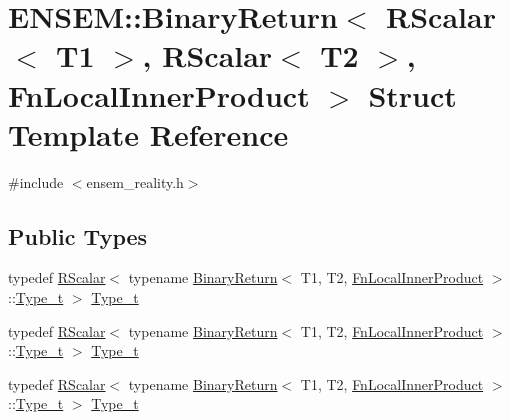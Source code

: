 \hypertarget{structENSEM_1_1BinaryReturn_3_01RScalar_3_01T1_01_4_00_01RScalar_3_01T2_01_4_00_01FnLocalInnerProduct_01_4}{}\section{E\+N\+S\+EM\+:\+:Binary\+Return$<$ R\+Scalar$<$ T1 $>$, R\+Scalar$<$ T2 $>$, Fn\+Local\+Inner\+Product $>$ Struct Template Reference}
\label{structENSEM_1_1BinaryReturn_3_01RScalar_3_01T1_01_4_00_01RScalar_3_01T2_01_4_00_01FnLocalInnerProduct_01_4}


{\ttfamily \#include $<$ensem\+\_\+reality.\+h$>$}

\subsection*{Public Types}
\begin{DoxyCompactItemize}
\item 
typedef \mbox{\hyperlink{classENSEM_1_1RScalar}{R\+Scalar}}$<$ typename \mbox{\hyperlink{structENSEM_1_1BinaryReturn}{Binary\+Return}}$<$ T1, T2, \mbox{\hyperlink{structENSEM_1_1FnLocalInnerProduct}{Fn\+Local\+Inner\+Product}} $>$\+::\mbox{\hyperlink{structENSEM_1_1BinaryReturn_3_01RScalar_3_01T1_01_4_00_01RScalar_3_01T2_01_4_00_01FnLocalInnerProduct_01_4_a0b84b9f7bc7dfb44e916186f013e5213}{Type\+\_\+t}} $>$ \mbox{\hyperlink{structENSEM_1_1BinaryReturn_3_01RScalar_3_01T1_01_4_00_01RScalar_3_01T2_01_4_00_01FnLocalInnerProduct_01_4_a0b84b9f7bc7dfb44e916186f013e5213}{Type\+\_\+t}}
\item 
typedef \mbox{\hyperlink{classENSEM_1_1RScalar}{R\+Scalar}}$<$ typename \mbox{\hyperlink{structENSEM_1_1BinaryReturn}{Binary\+Return}}$<$ T1, T2, \mbox{\hyperlink{structENSEM_1_1FnLocalInnerProduct}{Fn\+Local\+Inner\+Product}} $>$\+::\mbox{\hyperlink{structENSEM_1_1BinaryReturn_3_01RScalar_3_01T1_01_4_00_01RScalar_3_01T2_01_4_00_01FnLocalInnerProduct_01_4_a0b84b9f7bc7dfb44e916186f013e5213}{Type\+\_\+t}} $>$ \mbox{\hyperlink{structENSEM_1_1BinaryReturn_3_01RScalar_3_01T1_01_4_00_01RScalar_3_01T2_01_4_00_01FnLocalInnerProduct_01_4_a0b84b9f7bc7dfb44e916186f013e5213}{Type\+\_\+t}}
\item 
typedef \mbox{\hyperlink{classENSEM_1_1RScalar}{R\+Scalar}}$<$ typename \mbox{\hyperlink{structENSEM_1_1BinaryReturn}{Binary\+Return}}$<$ T1, T2, \mbox{\hyperlink{structENSEM_1_1FnLocalInnerProduct}{Fn\+Local\+Inner\+Product}} $>$\+::\mbox{\hyperlink{structENSEM_1_1BinaryReturn_3_01RScalar_3_01T1_01_4_00_01RScalar_3_01T2_01_4_00_01FnLocalInnerProduct_01_4_a0b84b9f7bc7dfb44e916186f013e5213}{Type\+\_\+t}} $>$ \mbox{\hyperlink{structENSEM_1_1BinaryReturn_3_01RScalar_3_01T1_01_4_00_01RScalar_3_01T2_01_4_00_01FnLocalInnerProduct_01_4_a0b84b9f7bc7dfb44e916186f013e5213}{Type\+\_\+t}}
\end{DoxyCompactItemize}


